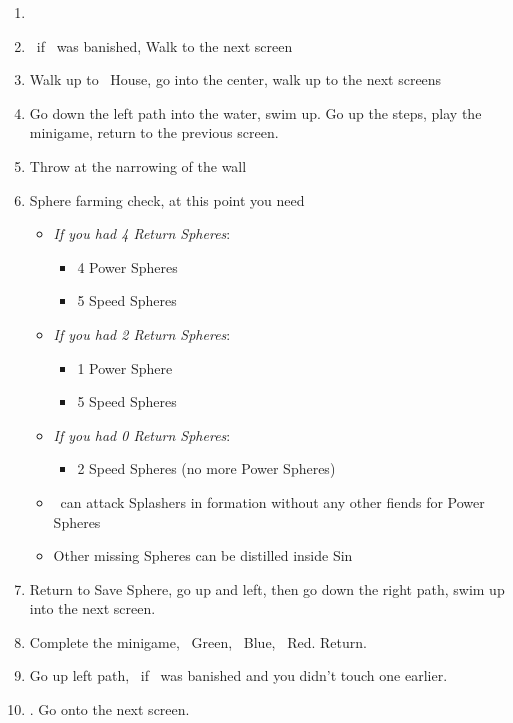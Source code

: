 \begin{enumerate}[resume]
    \item \formation{\tidus}{\kimahri}{\auron}
    \item \save\ if \bahamut\ was banished, Walk to the next screen
    \item Walk up to \tidus\ House, go into the center, walk up to the next screens
    \item Go down the left path into the water, swim up. Go up the steps, play the minigame, return to the previous screen.
    \item Throw at the  narrowing of the  wall
    \item Sphere farming check, at this point you need
    \begin{itemize}
        \item \textit{If you had 4 Return Spheres}:
        \begin{itemize}
            \item 4 Power Spheres
            \item 5 Speed Spheres
        \end{itemize}
        \item \textit{If you had 2 Return Spheres}:
        \begin{itemize}
            \item 1 Power Sphere
            \item 5 Speed Spheres
        \end{itemize}
        \item \textit{If you had 0 Return Spheres}:
        \begin{itemize}
            \item 2 Speed Spheres (no more Power Spheres)
        \end{itemize}
        \item \tidus\ can attack Splashers in formation without any other fiends for Power Spheres
        \item Other missing Spheres can be distilled inside Sin
    \end{itemize}
    \item Return to Save Sphere, go up and left, then go down the right path, swim up into the next screen.
    \item Complete the minigame, \rikku\ Green, \tidus\ Blue, \wakka\ Red. Return.
    \item Go up left path, \save\ if \bahamut\ was banished and you didn't touch one earlier.
    \item \formation{\tidus}{\yuna}{\wakka}. Go onto the next screen.
\end{enumerate}
